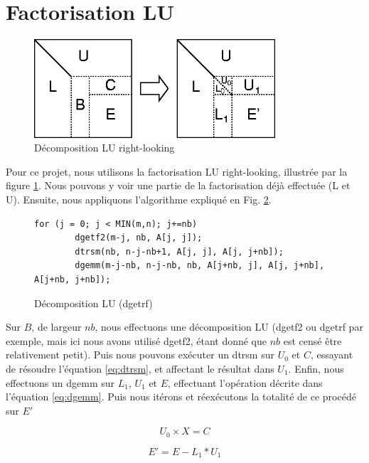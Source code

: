 \section{Factorisation LU} %
\label{sec:factorisation_lu}


\begin{figure}[H]
\centering
\includegraphics[width=0.8\textwidth]{lu.png}
\caption{Décomposition LU right-looking}
\label{fig:lu}
\end{figure}
Pour ce projet, nous utilisons la factorisation LU right-looking, illustrée par la figure \ref{fig:lu}. Nous pouvons y voir une partie de la factorisation déjà effectuée (L et U). Ensuite, nous appliquons l'algorithme expliqué en Fig. \ref{code:lu}.

\begin{figure}[H]
\begin{lstlisting}
for (j = 0; j < MIN(m,n); j+=nb)
		dgetf2(m-j, nb, A[j, j]);
		dtrsm(nb, n-j-nb+1, A[j, j], A[j, j+nb]);
		dgemm(m-j-nb, n-j-nb, nb, A[j+nb, j], A[j, j+nb], A[j+nb, j+nb]);
\end{lstlisting}
\caption{Décomposition LU (dgetrf)}
\label{code:lu}
\end{figure}
Sur $B$, de largeur $nb$, nous effectuons une décomposition LU (dgetf2 ou dgetrf par exemple, mais ici nous avons utilisé dgetf2, étant donné que $nb$ est censé être relativement petit). Puis nous pouvons exécuter un dtrsm sur $U_0$ et $C$, essayant de résoudre l'équation \ref{eq:dtrsm}, et affectant le résultat dans $U_1$. Enfin, nous effectuons un dgemm sur $L_1$, $U_1$ et $E$, effectuant l'opération décrite dans l'équation \ref{eq:dgemm}. Puis nous itérons et réexécutons la totalité de ce procédé sur $E'$

\begin{equation}
\label{eq:dtrsm}
U_0 \times X = C
\end{equation}

\begin{equation}
\label{eq:dgemm}
E' = E - L_1 * U_1
\end{equation}

